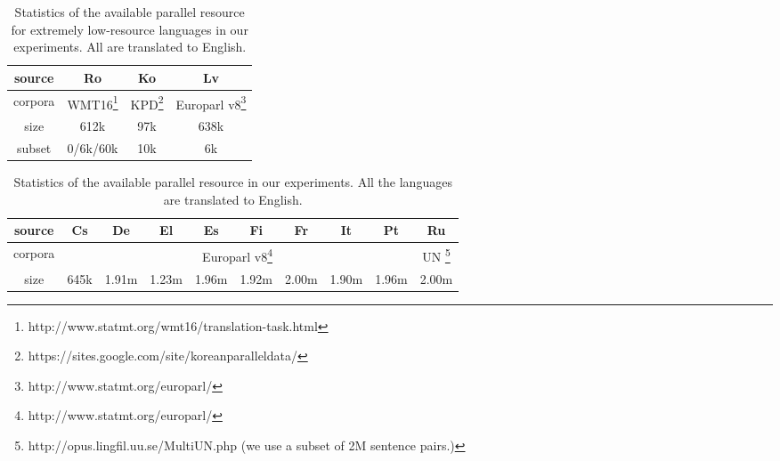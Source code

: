 \begin{savenotes}
\begin{table}[hptb]
\centering
\begin{tabular}{c|ccc}%
\hline
source &  
\multicolumn{1}{c|}{Ro} & 
\multicolumn{1}{c|}{Ko} & 
\multicolumn{1}{c}{Lv}  \\ \hline
corpora & 
\multicolumn{1}{c|}{WMT16\footnote{http://www.statmt.org/wmt16/translation-task.html}} & 
\multicolumn{1}{c|}{KPD\footnote{https://sites.google.com/site/koreanparalleldata/}} &  
\multicolumn{1}{c}{Europarl v8\footnote{http://www.statmt.org/europarl/}} \\ \hline
size 
& \multicolumn{1}{c|}{612k} & \multicolumn{1}{c|}{97k} & \multicolumn{1}{c}{638k}  \\ \hline
subset & \multicolumn{1}{c|}{0/6k/60k} & \multicolumn{1}{c|}{10k} & \multicolumn{1}{c}{6k} \\ \hline
\end{tabular}
\caption{\label{cp5.table.data0}Statistics of the available parallel resource for extremely low-resource languages in our experiments. 	All are translated to English.}
\end{table}
\end{savenotes}

\begin{savenotes}
\begin{table}[hptb]
\centering
\begin{tabular}{c|ccccccccc}
\hline
source &  
\multicolumn{1}{c|}{Cs} & \multicolumn{1}{c|}{De} & \multicolumn{1}{c|}{El}  & \multicolumn{1}{c|}{Es}  & \multicolumn{1}{c|}{Fi} & 
\multicolumn{1}{c|}{Fr} & \multicolumn{1}{c|}{It} & \multicolumn{1}{c|}{Pt} &  
\multicolumn{1}{c}{Ru}  \\ \hline
corpora & \multicolumn{8}{c|}{Europarl v8\footnote{http://www.statmt.org/europarl/}} & \multicolumn{1}{c}{UN \footnote{http://opus.lingfil.uu.se/MultiUN.php (we use a subset of 2M sentence pairs.)}} \\ \hline
size 
& \multicolumn{1}{c|}{645k} & \multicolumn{1}{c|}{1.91m} 
& \multicolumn{1}{c|}{1.23m} & \multicolumn{1}{c|}{1.96m} & \multicolumn{1}{c|}{1.92m} & \multicolumn{1}{c|}{2.00m} & \multicolumn{1}{c|}{1.90m} 
& \multicolumn{1}{c|}{1.96m} & \multicolumn{1}{c}{2.00m}  \\ \hline
\end{tabular}
\caption{\label{cp5.table.data1}Statistics of the available parallel resource in our experiments. 	All the languages are translated to English.}
\end{table}
\end{savenotes}



